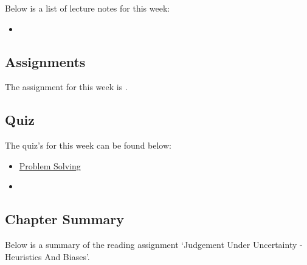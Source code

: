 \noindent Below is a list of lecture notes for this week:

\begin{itemize}
    \item {}
\end{itemize}

\subsection{Assignments}

The assignment for this week is .  

\subsection{Quiz}

The quiz's for this week can be found below:

\begin{itemize}
    \item \href{https://applied.cs.colorado.edu/mod/quiz/view.php?id=49364}{Problem Solving}  
    \item {}
\end{itemize}

\subsection{Chapter Summary}

Below is a summary of the reading assignment `Judgement Under Uncertainty - Heuristics And Biases'.

